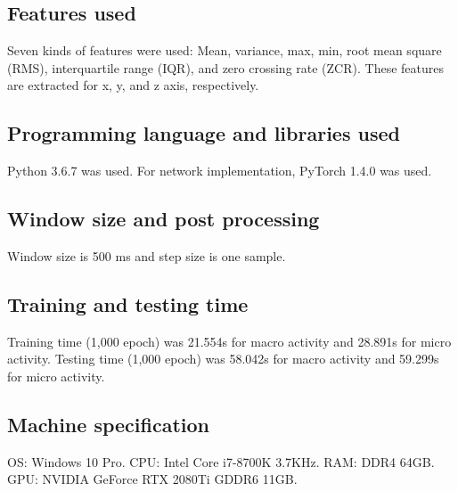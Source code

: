 \documentclass{svmult}
\begin{document}
\subsection*{Features used}
Seven kinds of features were used: Mean, variance, max, min, root mean square (RMS), interquartile range (IQR), and zero crossing rate (ZCR).
These features are extracted for x, y, and z axis, respectively.

\subsection*{Programming language and libraries used}
Python 3.6.7 was used. For network implementation, PyTorch 1.4.0 was used.

\subsection*{Window size and post processing}
Window size is 500 ms and step size is one sample.

\subsection*{Training and testing time}
Training time (1,000 epoch) was 21.554s for macro activity and 28.891s for micro activity.
Testing time (1,000 epoch) was 58.042s for macro activity and 59.299s for micro activity.

\subsection*{Machine specification}
OS: Windows 10 Pro. CPU: Intel Core i7-8700K 3.7KHz. RAM: DDR4 64GB. GPU: NVIDIA GeForce RTX 2080Ti GDDR6 11GB.

%



%
\end{document}
